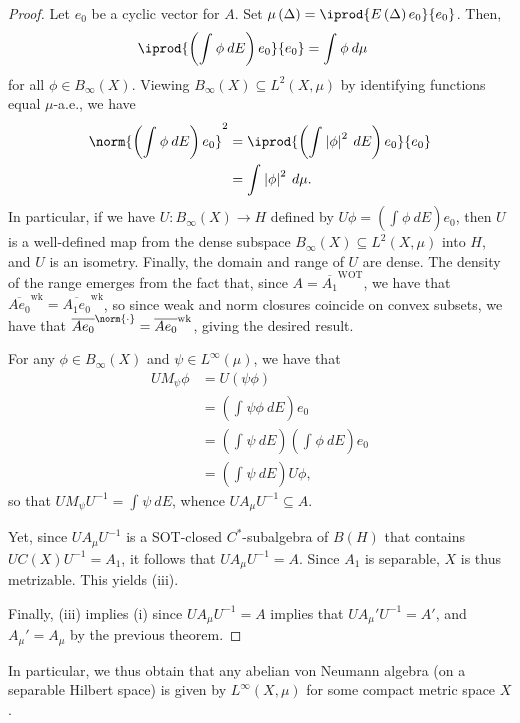 \documentclass[10pt]{mypackage}
\begin{document}
\begin{proof}
  Let $e_0$ be a cyclic vector for $A$. Set $\mu\left( \Delta \right) = \iprod{E\left( \Delta \right)e_0}{e_0}$. Then,
  \begin{align*}
    \iprod{ \left( \int_{}^{} \phi\:dE \right)e_0 }{e_0} &= \int_{}^{} \phi\:d\mu
  \end{align*}
  for all $\phi\in B_{\infty}(X)$. Viewing $B_{\infty}(X)\subseteq L^2\left( X,\mu \right)$ by identifying functions equal $\mu$-a.e., we have
  \begin{align*}
    \norm{\left( \int_{}^{} \phi\:dE \right)e_0}^2 &= \iprod{ \left( \int_{}^{} \left\vert \phi \right\vert^2\:dE \right)e_0 }{e_0}\\
                                                   &= \int_{}^{} \left\vert \phi \right\vert^2\:d\mu.
  \end{align*}
  In particular, if we have $U\colon B_{\infty}(X)\to H$ defined by $U\phi = \left( \int_{}^{} \phi\:dE \right)e_0$, then $U$ is a well-defined map from the dense subspace $B_{\infty}\left( X \right)\subseteq L^2\left( X,\mu \right)$ into $H$, and $U$ is an isometry. Finally, the domain and range of $U$ are dense. The density of the range emerges from the fact that, since $A = \overline{A_1}^{\operatorname{WOT}}$, we have that $ \overline{Ae_0}^{\operatorname{wk}} = \overline{A_1e_0}^{\operatorname{wk}} $, so since weak and norm closures coincide on convex subsets, we have that $ \overline{Ae_0}^{\norm{\cdot}} = \overline{Ae_0}^{\operatorname{wk}} $, giving the desired result.

  For any $\phi\in B_{\infty}\left( X \right)$ and $\psi\in L^{\infty}\left( \mu \right)$, we have that
  \begin{align*}
    UM_{\psi}\phi &= U\left( \psi\phi \right)\\
                  &= \left( \int_{}^{} \psi\phi\:dE \right)e_0\\
                  &= \left( \int_{}^{} \psi\:dE \right)\left( \int_{}^{} \phi\:dE \right)e_0\\
                  &= \left( \int_{}^{} \psi\:dE \right)U\phi,
  \end{align*}
  so that $UM_{\psi}U^{-1} = \int_{}^{} \psi\:dE$, whence $UA_{\mu}U^{-1}\subseteq A$.

  Yet, since $UA_{\mu}U^{-1}$ is a SOT-closed $C^{\ast}$-subalgebra of $B(H)$ that contains $UC(X)U^{-1} = A_1$, it follows that $UA_{\mu}U^{-1} = A$. Since $A_1$ is separable, $X$ is thus metrizable. This yields (iii).

  Finally, (iii) implies (i) since $UA_{\mu}U^{-1} = A$ implies that $UA_{\mu}'U^{-1} = A'$, and $A_{\mu}' = A_{\mu}$ by the previous theorem.
\end{proof}
In particular, we thus obtain that any abelian von Neumann algebra (on a separable Hilbert space) is given by $L^{\infty}\left( X,\mu \right)$ for some compact metric space $X$.
\end{document}
